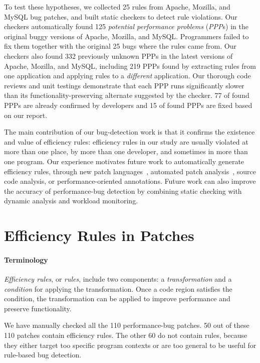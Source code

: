 To test these hypotheses, we collected 25 rules from Apache, Mozilla, and MySQL bug patches, 
and built static checkers to detect rule violations. 
Our checkers automatically found 125 {\it potential performance problems} 
({\it PPP}s)
in the original buggy versions of Apache, Mozilla, and MySQL. 
Programmers failed to fix them
together with the original 25 bugs where the rules came from. 
Our checkers also found 332 previously unknown PPPs
in the latest versions of Apache, Mozilla, and MySQL, 
including 219 PPPs found by extracting rules from one application and applying rules to a {\it different} application. 
Our thorough code reviews and unit testings demonstrate that
each PPP runs significantly slower than its functionality-preserving 
alternate suggested by the checker. 77 of found PPPs are already
confirmed by developers and 15 of found PPPs are fixed based on our report. 


The main contribution of our bug-detection work is that it confirms
the existence and value of efficiency rules: efficiency rules in
our study are usually violated at more than one place, by more than one
developer, and sometimes in more than one program.
Our experience motivates future work to automatically
generate efficiency rules,
through new patch languages~\citep{10yearlinux}, 
automated patch analysis~\citep{kim.pldi11}, source code analysis, or
performance-oriented annotations. Future work can also
improve the accuracy of performance-bug detection
by combining static checking with dynamic analysis and workload 
monitoring.



\section{Efficiency Rules in Patches}

\paragraph{Terminology} \emph{Efficiency rules}, or \emph{ rules}, include two 
components: a \emph{transformation} and a \emph{condition} for applying the 
transformation. Once a code region satisfies the condition, 
the transformation can be applied to improve performance and preserve
functionality. 

We have manually checked all the 110 performance-bug patches.
50 out of these 110 patches contain efficiency rules. 
The other 60 do not contain rules, because they
either target too specific program contexts or are too general to be useful
for rule-based bug detection.



